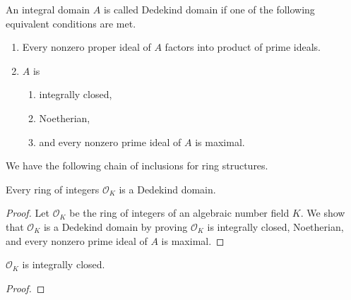 \begin{defbox}
    \begin{definition}
        An integral domain \(A\) is called Dedekind domain if one of the following equivalent conditions are met.
        \begin{enumerate}
            \item Every nonzero proper ideal of \(A\) factors into product of prime ideals.
            \item \(A\) is
            \begin{enumerate}
                \item integrally closed,
                \item Noetherian,
                \item and every nonzero prime ideal of \(A\) is maximal.
            \end{enumerate}
        \end{enumerate}
    \end{definition}
\end{defbox}

\begin{rembox}
    \begin{remark}
        We have the following chain of inclusions for ring structures.
    \end{remark}
\end{rembox}

\begin{thmbox}
    \begin{theorem}
        Every ring of integers \(\mathcal{O}_K\) is a Dedekind domain.
    \end{theorem}    
\end{thmbox}
\begin{proof}
    Let \(\mathcal{O}_K\) be the ring of integers of an algebraic number field \(K\). We show that \(\mathcal{O}_K\) is a Dedekind domain by proving \(\mathcal{O}_K\) is integrally closed, Noetherian, and every nonzero prime ideal of \(A\) is maximal.
\end{proof}

\begin{thmbox}
    \begin{lemma}
        \(\mathcal{O}_K\) is integrally closed.
    \end{lemma}
\end{thmbox}
\begin{proof}
    
\end{proof}

